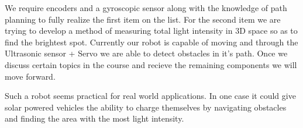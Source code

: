 \documentclass[a4paper, 12pt]{article}
\begin{document}
    We require encoders and a gyroscopic sensor along with the knowledge of path planning to fully realize the first item on the list. For the second item we are trying to develop a method of measuring total light intensity in 3D space so as to find the brightest spot. Currently our robot is capable of moving and through the Ultrasonic sensor + Servo
    we are able to detect obstacles in it's path. Once we discuss certain topics in the course and recieve the remaining components we will move forward.

    Such a robot seems practical for real world applications. In one case it could give solar powered vehicles the ability to charge themselves by navigating obstacles and finding the area with the most light intensity.
\end{document}
